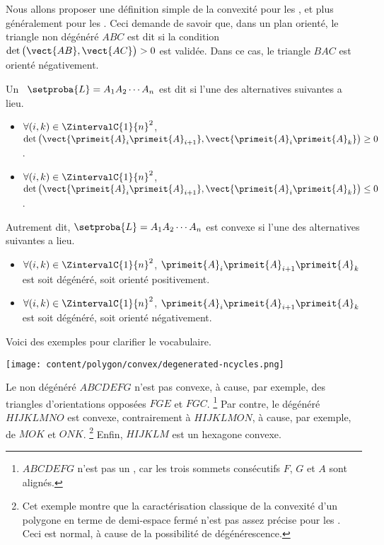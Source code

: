 Nous allons proposer une définition simple de la convexité pour les \ngones, et plus généralement pour les \ncycles. Ceci demande de savoir que, dans un plan orienté, le triangle non dégénéré $ABC$ est dit  si la condition $\det \big( \vect{AB} , \vect{AC} \big) > 0$ est validée.
Dans ce cas, le triangle $BAC$ est orienté négativement.




\newpage %


\begin{defi} \label{conv-ncycle-def}
	Un \ncycle\ $\setproba{L} = A_1 A_2 \cdots A_n$ est dit  si  l'une des alternatives suivantes a lieu.
	\begin{itemize}
		\item $\forall (i, k) \in \ZintervalC{1}{n}^2$,
		$\det \big( \vect{\primeit{A}_i \primeit{A}_{i+1}}, \vect{\primeit{A}_i \primeit{A}_k} \big) \geq 0$.

		\item $\forall (i, k) \in \ZintervalC{1}{n}^2$,
		$\det \big( \vect{\primeit{A}_i \primeit{A}_{i+1}}, \vect{\primeit{A}_i \primeit{A}_k} \big) \leq 0$.
    \end{itemize}
	
	Autrement dit, $\setproba{L} = A_1 A_2 \cdots A_n$ est convexe si l'une des alternatives suivantes a lieu.
	\begin{itemize}
		\item $\forall (i, k) \in \ZintervalC{1}{n}^2$,
		$\primeit{A}_i \primeit{A}_{i+1} \primeit{A}_k$ est soit dégénéré, soit  orienté positivement.

		\item $\forall (i, k) \in \ZintervalC{1}{n}^2$,
		$\primeit{A}_i \primeit{A}_{i+1} \primeit{A}_k$ est soit dégénéré, soit  orienté négativement.
    \end{itemize}
\end{defi}


\begin{remark}
    Voici des exemples pour clarifier le vocabulaire.	
    
    \begin{center}
    	\texttt{[image: content/polygon/convex/degenerated-ncycles.png]}
    \end{center}
    
    Le  non dégénéré $ABCDEFG$ n'est pas convexe, à cause, par exemple, des triangles d'orientations opposées $FGE$ et $FGC$.%
    \footnote{
        $ABCDEFG$ n'est pas un , car les trois sommets consécutifs $F$, $G$ et $A$ sont alignés.
    }
    Par contre,
    le  dégénéré $HIJKLMNO$ est convexe, contrairement à $HIJKLMON$, à cause, par exemple, de $MOK$ et $ONK$.%
    \footnote{
         Cet exemple montre que la caractérisation classique de la convexité d'un polygone en terme de demi-espace fermé n'est pas assez précise pour les \ncycles. Ceci est normal, à cause de la possibilité de dégénérescence.
    }
    Enfin,
    $HIJKLM$ est un hexagone convexe.
\end{remark}


